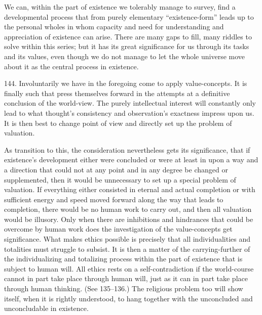 \documentclass[12pt,a4paper]{book}
\newcommand{\opage}[1]{\marginnote{\footnotesize\textit{[#1]}}}
\begin{document}
We can, within the part of existence we tolerably manage to survey, find a developmental process that from
purely elementary ``existence-form'' leads up to the personal wholes in whom capacity and need for
understanding and appreciation of existence can arise. There are many gaps to fill, many riddles to solve
within this series; but it has its great significance for us through its tasks and its values, even though
we do not manage to let the whole universe move about it as the central process in existence.

144. Involuntarily we have in the foregoing come to apply value-concepts. It is finally such that press
themselves forward in the attempts at a definitive conclusion of the world-view. The purely intellectual
interest will constantly only lead to what thought's consistency and observation's exactness impress upon
us. It is then best to change point of view and directly set up the problem of valuation.

As transition to this, the consideration nevertheless gets its significance, that if existence's
development either were concluded or were at least in upon a way and a direction that could not at any
point and in any degree be changed or supplemented, then it would be unnecessary to set up a special
problem of valuation. If everything either consisted in eternal and actual completion or with sufficient
energy and speed moved forward along the way that leads to completion, there would be no human work to
carry out, and then all valuation would be illusory. Only when there are inhibitions \opage{345}and hindrances that
could be overcome by human work does the investigation of the value-concepts get significance. What makes
ethics possible is precisely that all individualities and totalities must struggle to subsist. It is then
a matter of the carrying-further of the individualizing and totalizing process within the part of
existence that is subject to human will. All ethics rests on a self-contradiction if the world-course
cannot in part take place through human will, just as it can in part take place through human thinking.
(See 135--136.) The religious problem too will show itself, when it is rightly understood, to hang
together with the unconcluded and unconcludable in existence.
\end{document}
